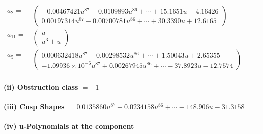\documentclass[1p]{elsarticle_modified}
\theoremstyle{definition}
\begin{document}
\begin{tabular}{m{7pt} m{180pt} m{7pt} m{180pt} }
\flushright $a_{2}=$&$\begin{pmatrix}-0.00467421 u^{87}+0.0109893 u^{86}+\cdots+15.1651 u-4.16426\\0.00197314 u^{87}-0.00700781 u^{86}+\cdots+30.3390 u+12.6165\end{pmatrix}$ \\
\flushright $a_{11}=$&$\begin{pmatrix}u\\u^3+u\end{pmatrix}$ \\
\flushright $a_{5}=$&$\begin{pmatrix}0.000632418 u^{87}-0.00298532 u^{86}+\cdots+1.50043 u+2.65355\\-1.09936\times10^{-6} u^{87}+0.00267945 u^{86}+\cdots-37.8923 u-12.7574\end{pmatrix}$\\&\end{tabular}
\flushleft \textbf{(ii) Obstruction class $= -1$}\\~\\
\flushleft \textbf{(iii) Cusp Shapes $= 0.0135860 u^{87}-0.0234158 u^{86}+\cdots-148.906 u-31.3158$}\\~\\
\newpage\renewcommand{\arraystretch}{1}
\flushleft \textbf{(iv) u-Polynomials at the component}\newline \\
\end{document}
